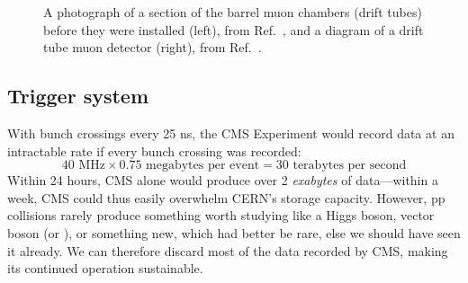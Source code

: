 \begin{figure}[htb]
    \centering
    \quad
    \caption[A photograph of a section of the barrel muon chambers and a diagram of a drift tube muon detector]{
        A photograph of a section of the barrel muon chambers (drift tubes) before they were installed (left), from Ref.~\cite{Hoch:1274451}, and a diagram of a drift tube muon detector (right), from Ref.~\cite{CMSWebMuonDT}. 
    }
    \label{fig:cms_muon_DT}
\end{figure}

\subsection{Trigger system}
With bunch crossings every 25 ns, the CMS Experiment would record data at an intractable rate if every bunch crossing was recorded:
\begin{equation}
40\text{ MHz} \times 0.75\text{ megabytes per event} = 30\text{ terabytes per second}
\end{equation}
Within 24 hours, CMS alone would produce over 2 \textit{exabytes} of data---within a week, CMS could thus easily overwhelm CERN's storage capacity. 
However, pp collisions rarely produce something worth studying like a Higgs boson, vector boson (\PW or \PZ), or something new, which had better be rare, else we should have seen it already. 
We can therefore discard most of the data recorded by CMS, making its continued operation sustainable. 

